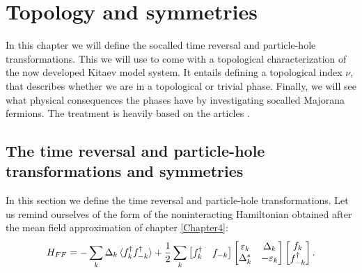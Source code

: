 
\chapter{Topology and symmetries} %

\label{Chapter7} %


In this chapter we will define the socalled time reversal and particle-hole transformations. This we will use to come with a topological characterization of the now developed Kitaev model system. It entails defining a topological index $\nu$, that describes whether we are in a topological or trivial phase. Finally, we will see what physical consequences the phases have by investigating socalled Majorana fermions. The treatment is heavily based on the articles \cite{Ludwig.Topology, Chiu.Topology, Alicea}. 

\section{The time reversal and particle-hole transformations and symmetries}
In this section we define the time reversal and particle-hole transformations. Let us remind ourselves of the form of the noninteracting Hamiltonian obtained after the mean field approximation of chapter \ref{Chapter4}: 
\begin{equation}
H_{FF} = -\sum_k \Delta_k \braket {f^\dagger_k f^\dagger_{-k}} + \frac{1}{2}\sum_{k} \begin{bmatrix} f^\dagger_k & f_{-k} \end{bmatrix} \begin{bmatrix} \varepsilon_k & \Delta_k \\ \Delta^*_k & -\varepsilon_k \end{bmatrix} \begin{bmatrix} f_k \\ f^\dagger_{-k} \end{bmatrix}. \nonumber 
\end{equation}

